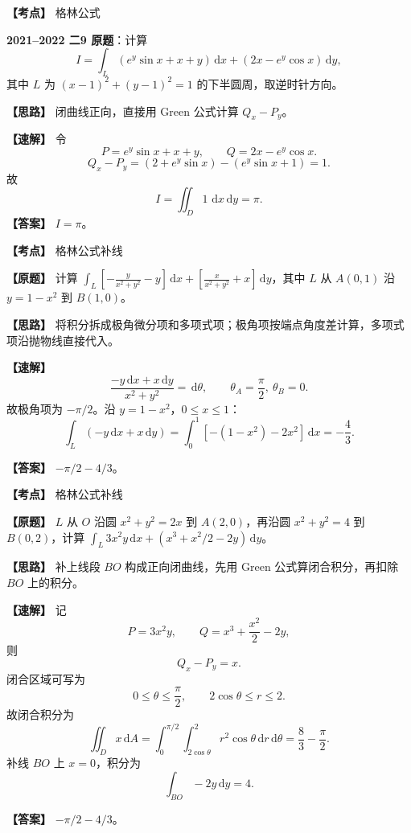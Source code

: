 ﻿\documentclass[11pt,a4paper,UTF8]{ctexart}
\newcommand{\dd}{\,\mathrm d}
\begin{document}
\begin{answerbox}[2021--2022 二-9]
\textbf{【考点】} 格林公式

\textbf{2021--2022 二9 原题}：计算
\[
I=\int_L (e^y\sin x+x+y)\dd x+(2x-e^y\cos x)\dd y,
\]
其中 $L$ 为 $(x-1)^2+(y-1)^2=1$ 的下半圆周，取逆时针方向。

\textbf{【思路】} 闭曲线正向，直接用 Green 公式计算 $Q_x-P_y$。

\textbf{【速解】} 令
\[
P=e^y\sin x+x+y,\qquad Q=2x-e^y\cos x.
\]
\[
Q_x-P_y=(2+e^y\sin x)-(e^y\sin x+1)=1.
\]
故
\[
I=\iint_D1\,\dd x\dd y=\pi.
\]
\textbf{【答案】} $I=\pi$。

\end{answerbox}

\newpage

\begin{answerbox}[2024--2025 九]
\textbf{【考点】} 格林公式补线

\textbf{【原题】} 计算 $\displaystyle \int_L\left[-\frac{y}{x^2+y^2}-y\right]\dd x+\left[\frac{x}{x^2+y^2}+x\right]\dd y$，其中 $L$ 从 $A(0,1)$ 沿 $y=1-x^2$ 到 $B(1,0)$。

\textbf{【思路】} 将积分拆成极角微分项和多项式项；极角项按端点角度差计算，多项式项沿抛物线直接代入。

\textbf{【速解】}
\[
\frac{-y\dd x+x\dd y}{x^2+y^2}=\dd\theta,\qquad
\theta_A=\frac\pi2,\ \theta_B=0.
\]
故极角项为 $-\pi/2$。沿 $y=1-x^2$，$0\le x\le1$：
\[
\int_L(-y\dd x+x\dd y)
=\int_0^1[-(1-x^2)-2x^2]\dd x=-\frac43.
\]

\textbf{【答案】} $-\pi/2-4/3$。
\end{answerbox}

\begin{answerbox}[2023--2024 三-2]
\textbf{【考点】} 格林公式补线

\textbf{【原题】} $L$ 从 $O$ 沿圆 $x^2+y^2=2x$ 到 $A(2,0)$，再沿圆 $x^2+y^2=4$ 到 $B(0,2)$，计算 $\displaystyle \int_L3x^2y\dd x+(x^3+x^2/2-2y)\dd y$。

\textbf{【思路】} 补上线段 $BO$ 构成正向闭曲线，先用 Green 公式算闭合积分，再扣除 $BO$ 上的积分。

\textbf{【速解】} 记
\[
P=3x^2y,\qquad Q=x^3+\frac{x^2}{2}-2y,
\]
则
\[
Q_x-P_y=x.
\]
闭合区域可写为
\[
0\le\theta\le\frac\pi2,\qquad 2\cos\theta\le r\le2.
\]
故闭合积分为
\[
\iint_Dx\dd A
=\int_0^{\pi/2}\int_{2\cos\theta}^{2}r^2\cos\theta\dd r\dd\theta
=\frac83-\frac\pi2.
\]
补线 $BO$ 上 $x=0$，积分为
\[
\int_{BO}-2y\dd y=4.
\]

\textbf{【答案】} $-\pi/2-4/3$。
\end{answerbox}
\end{document}

